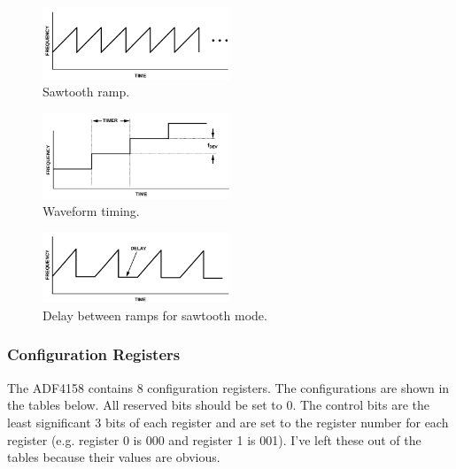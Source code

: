 \begin{figure}[h]
  \centering
  \includegraphics[width=0.5\textwidth]{data/adf4158-sawtooth-ramp.png}
  \caption{Sawtooth ramp.}
  \label{fig:adf4158-sawtooth-ramp}\end{figure}

\begin{figure}[h]
  \centering
  \includegraphics[width=0.5\textwidth]{data/adf4158-waveform-timing.png}
  \caption{Waveform timing.}
  \label{fig:adf4158-waveform-timing}
\end{figure}

\begin{figure}[h]
  \centering
  \includegraphics[width=0.5\textwidth]{data/adf4158-delay.png}
  \caption{Delay between ramps for sawtooth mode.}
  \label{fig:adf4158-delay}
\end{figure}

\subsubsection{Configuration Registers}
\label{sec:adf4158-config-regs}

The ADF4158 contains 8 configuration registers. The configurations are shown in the tables
below. All reserved bits should be set to 0. The control bits are the least significant 3 bits of
each register and are set to the register number for each register (e.g. register 0 is 000 and
register 1 is 001). I've left these out of the tables because their values are obvious.

